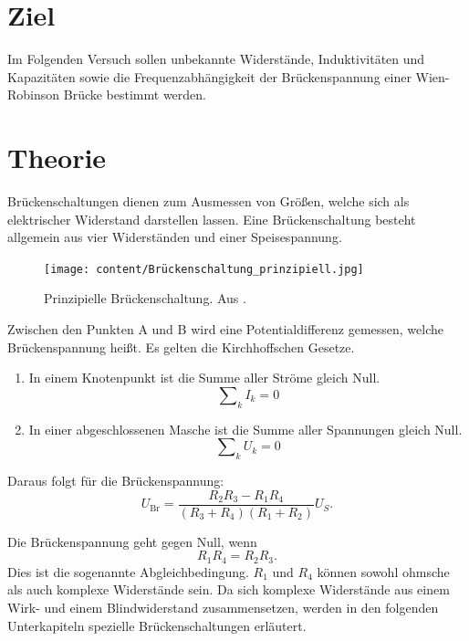 \section{Ziel}
\label{sec:Ziel}
Im Folgenden Versuch sollen unbekannte Widerstände, Induktivitäten und Kapazitäten sowie die Frequenzabhängigkeit der Brückenspannung einer Wien-Robinson Brücke bestimmt werden.

\section{Theorie}
\label{sec:Theorie}
Brückenschaltungen dienen zum Ausmessen von Größen, welche sich als elektrischer Widerstand darstellen lassen. Eine Brückenschaltung besteht allgemein aus vier Widerständen und einer Speisespannung.

\begin{figure}
  \centering
  \texttt{[image: content/Brückenschaltung\_prinzipiell.jpg]}
  \caption{Prinzipielle Brückenschaltung. Aus \cite{anleitung302}.}
  \label{fig:brückenschaltung}
\end{figure}

Zwischen den Punkten A und B wird eine Potentialdifferenz gemessen, welche Brückenspannung heißt.
Es gelten die Kirchhoffschen Gesetze.
\begin{enumerate}
  \item In einem Knotenpunkt ist die Summe aller Ströme gleich Null.
  \begin{equation}
    \mathrm\sum_{k} I_k = 0
  \end{equation}
  \item In einer abgeschlossenen Masche ist die Summe aller Spannungen gleich Null.
  \begin{equation}
    \mathrm\sum_{k} U_k = 0
  \end{equation}
\end{enumerate}

Daraus folgt für die Brückenspannung:
\begin{equation}
  U_{\mathrm{Br}} = \frac{R_{2}R_3 - R_{1}R_4}{(R_3 + R_4)(R_{1} + R_{2})} U_S .
\end{equation}

Die Brückenspannung geht gegen Null, wenn
\begin{equation}
  R_{1} R_4 = R_{2} R_3 .
\end{equation}
Dies ist die sogenannte Abgleichbedingung.
$R_{1}$ und $R_4$ können sowohl ohmsche als auch komplexe Widerstände sein. Da sich komplexe Widerstände aus einem Wirk- und einem Blindwiderstand  zusammensetzen, werden in den folgenden Unterkapiteln spezielle Brückenschaltungen erläutert.

